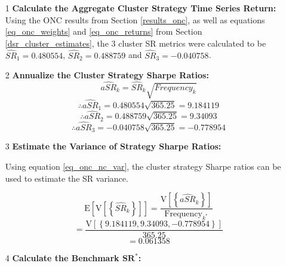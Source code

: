 \documentclass[a4paper,11pt,oneside]{article}
\theoremstyle{plain}
\theoremstyle{definition}
\begin{document}
	\begin{itemize}
		\item [1] \textbf{Calculate the Aggregate Cluster Strategy Time Series Return:} \newline
		Using the ONC results from Section \ref{results_onc}, as well as equations \eqref{eq_onc_weights} and \eqref{eq_onc_returns} from Section \ref{dsr_cluster_estimates}, the 3 cluster SR metrics were calculated to be $\widehat{SR}_{1}={0.480554}$, $\widehat{SR}_{2}={0.488759}$ and $\widehat{SR}_{3}={-0.040758}$. \newline
		
		\item [2] \textbf{Annualize the Cluster Strategy Sharpe Ratios:} \newline
		\begin{equation}
		\widehat{aSR}_{k}=\widehat{SR}_{k}\sqrt{{Frequency_{k}}}
		\end{equation}
		\begin{equation}
		\therefore \widehat{aSR}_{1}={0.480554}\sqrt{{365.25}}={9.184119}
		\end{equation}
		\begin{equation}
		\therefore \widehat{aSR}_{2}={0.488759}\sqrt{{365.25}} ={9.34093}
		\end{equation}
		\begin{equation}
		\therefore \widehat{aSR}_{3}={-0.040758}\sqrt{{365.25}} ={-0.778954}
		\end{equation}
		
		\item [3] \textbf{Estimate the Variance of Strategy Sharpe Ratios:} \newline
		
		Using equation \eqref{eq_onc_nc_var}, the cluster strategy Sharpe ratios can be used to estimate the SR variance. 
		
		\begin{equation}
		\mathrm{E}\left[\mathrm{V}\left[\left\{\widehat{S R}_{k}\right\}\right]\right]=\frac{\mathrm{V}\left[\left\{\widehat{aSR}_{k}\right\}\right]}{\text {Frequency}_{k^{*}}}
		\end{equation}
		\begin{equation}
		=\frac{\mathrm{V}\left[\left\{{9.184119,9.34093,-0.778954} \right\}\right]}{\text {365.25}}
		\end{equation}
		\begin{equation}
		={0.061358}
		\end{equation}
		
		\item [4] \textbf{Calculate the Benchmark $\mathbf{SR^*}$:} \newline
		

\end{itemize}
\end{document}
